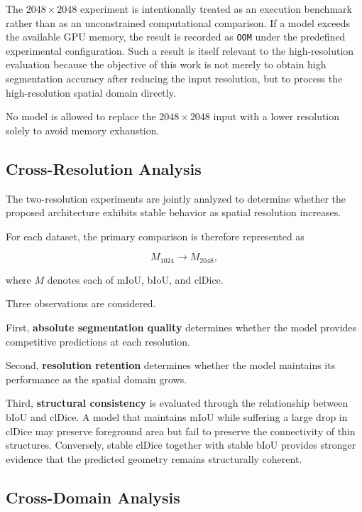 \documentclass[11pt,a4paper]{article}
\begin{document}
The $2048\times2048$ experiment is intentionally treated as an execution 
benchmark rather than as an unconstrained computational comparison. If a 
model exceeds the available GPU memory, the result is recorded as 
\texttt{OOM} under the predefined experimental configuration. Such a result 
is itself relevant to the high-resolution evaluation because the objective 
of this work is not merely to obtain high segmentation accuracy after 
reducing the input resolution, but to process the high-resolution spatial 
domain directly.

No model is allowed to replace the $2048\times2048$ input with a lower 
resolution solely to avoid memory exhaustion.


\subsection{Cross-Resolution Analysis}

The two-resolution experiments are jointly analyzed to determine whether 
the proposed architecture exhibits stable behavior as spatial resolution 
increases.

For each dataset, the primary comparison is therefore represented as

\begin{equation}
M_{1024}
\longrightarrow
M_{2048},
\end{equation}

where $M$ denotes each of mIoU, bIoU, and clDice.

Three observations are considered.

First, \textbf{absolute segmentation quality} determines whether the model 
provides competitive predictions at each resolution.

Second, \textbf{resolution retention} determines whether the model maintains 
its performance as the spatial domain grows.

Third, \textbf{structural consistency} is evaluated through the relationship 
between bIoU and clDice. A model that maintains mIoU while suffering a large 
drop in clDice may preserve foreground area but fail to preserve the 
connectivity of thin structures. Conversely, stable clDice together with 
stable bIoU provides stronger evidence that the predicted geometry remains 
structurally coherent.


\subsection{Cross-Domain Analysis}
\end{document}

